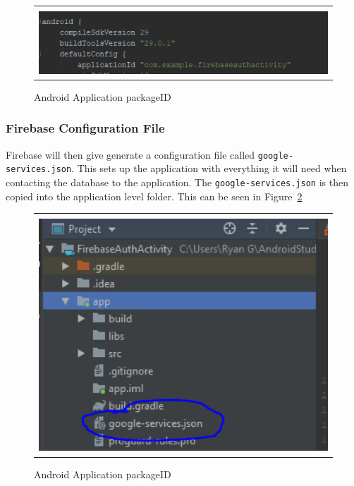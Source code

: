\documentclass[conference]{IEEEtran}
\begin{document}
\begin{figure}[h] %
\begin{tabular}{| p{}|}
\hline
\\
\begin{center}
\includegraphics[scale=.6]{../graphics/Step1.png} \end{center}\\
\hline
\end{tabular}	
	\caption{Android Application packageID}
	\label{fig:Step1}
\end{figure} 

\subsubsection{Firebase Configuration File}
Firebase will then give generate a configuration file called \texttt{google-services.json}. This sets up the application with everything it will need when contacting the database to the application.  The \texttt{google-services.json} is then copied  into the application level folder.  This can be seen in Figure~\ref{fig:Step2}
\begin{figure}[h] %
\begin{tabular}{| p{}|}
\hline
\\
\begin{center} \includegraphics[scale=.6]{../graphics/Step2.png} \end{center}\\
\hline
\end{tabular}	
	\caption{Android Application packageID}
	\label{fig:Step2}
\end{figure} 
\end{document}
